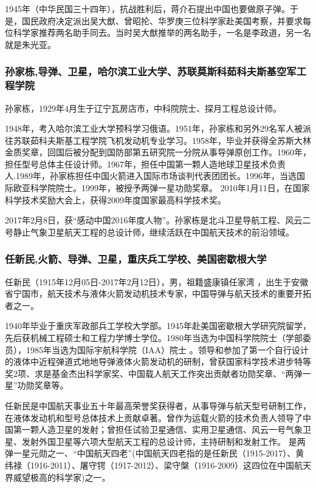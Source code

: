 \documentclass[UTF8]{ctexart}
\begin{document}
1945年（中华民国三十四年），抗战胜利后，蒋介石提出中国也要做原子弹。于是，国民政府决定派出吴大猷、曾昭抡、华罗庚三位科学家赴美国考察，并要求每位科学家推荐两名助手同去。当时吴大猷推举的两名助手，一名是李政道，另一名就是朱光亚。


    \subsubsection{孙家栋,导弹、卫星，哈尔滨工业大学、苏联莫斯科茹科夫斯基空军工程学院}

孙家栋，1929年4月生于辽宁瓦房店市，中科院院士、探月工程总设计师。 


1948年，考入哈尔滨工业大学预科学习俄语。1951年，孙家栋和另外29名军人被派往苏联茹科夫斯基工程学院飞机发动机专业学习。1958年，毕业并获得全苏斯大林金质奖章，回国后被分配到国防部第五研究院一分院从事导弹原创工作。1960年，担任型号总体主任设计师。1967年，担任中国第一颗人造地球卫星技术负责人.1989年，孙家栋担任中国火箭进入国际市场谈判代表团团长。1996年，当选国际欧亚科学院院士。1999年，被授予两弹一星功勋奖章。 2010年1月11日，在国家科学技术奖励大会上，获得2009年度国家最高科学技术奖。


2017年2月8日，获“感动中国2016年度人物”。孙家栋是北斗卫星导航工程、风云二号静止气象卫星航天工程的总设计师，继续活跃在中国航天技术的前沿领域。

    \subsubsection{任新民,火箭、导弹、卫星，重庆兵工学校、美国密歇根大学}
任新民（1915年12月05日-2017年2月12日），男，祖籍盛康镇任家湾 ，出生于安徽省宁国市，航天技术与液体火箭发动机技术专家，中国导弹与航天技术的重要开拓者之一。

1940年毕业于重庆军政部兵工学校大学部。1945年赴美国密歇根大学研究院留学，先后获机械工程硕士和工程力学博士学位。1980年当选为中国科学院院士（学部委员），1985年当选为国际宇航科学院（IAA）院士 。领导和参加了第一个自行设计的液体中近程弹道式地地导弹液体火箭发动机的研制，曾获国家科学技术进步特等奖2项、求是基金杰出科学家奖、中国载人航天工作突出贡献者功勋奖章、“两弹一星”功勋奖章等。

任新民是中国航天事业五十年最高荣誉奖获得者，从事导弹与航天型号研制工作，在液体发动机和型号总体技术上贡献卓著。曾作为运载火箭的技术负责人领导了中国第一颗人造卫星的发射；曾担任试验卫星通信、实用卫星通信、风云一号气象卫星、发射外国卫星等六项大型航天工程的总设计师，主持研制和发射工作。 是两弹一星元勋之一、“中国航天四老”(中国航天四老指的是任新民（1915-2017）、黄纬禄（1916-2011）、屠守锷（1917-2012）、梁守槃（1916-2009）这四位在中国航天界威望极高的科学家)之一。
    
\end{document}
